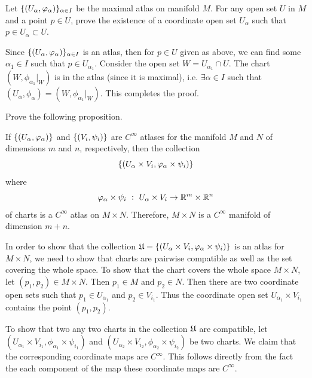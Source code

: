 \begin{problem}
	Let $ \{(U_\alpha, \varphi_\alpha)\}_{\alpha \in I} $ be the maximal atlas on manifold $ M $. For any open set $ U $ in $ M $ and a point $ p \in U $, prove the existence of a coordinate open set $ U_\alpha $ such that $ p \in U_\alpha \subset U $.
\end{problem}
\begin{solution}
	Since $ \{(U_\alpha,\varphi_\alpha)\}_{\alpha \in I} $ is an atlas, then for $ p \in U $ given as above, we can find some $ \alpha_1 \in I $ such that $ p \in U_{\alpha_1} $. Consider the open set $ W = U_{\alpha_1} \cap U $. The chart $ (W, \phi_{\alpha_1}|_W) $ is in the atlas (since it is maximal), i.e. $ \exists \alpha \in I $ such that $ (U_\alpha, \phi_\alpha) = (W, \phi_{\alpha_1}|_W) $. This completes the proof.
\end{solution}

\begin{problem}
	Prove the following proposition.
	\begin{proposition}
		If $ \{(U_\alpha,\varphi_\alpha)\} $ and $ \{(V_i,\psi_i)\} $ are $ C^\infty $ atlases for the manifold $ M $ and $ N $ of dimensions $ m $ and $ n $, respectively, then the collection 
		\[ \{(U_\alpha \times V_i,\varphi_\alpha \times \psi_i)\} \] where
		\[ \varphi_\alpha \times \psi_i\ :\ U_\alpha \times V_i \to \mathbb{R}^m \times \mathbb{R}^n \]
		of charts is a $ C^\infty $ atlas on $ M\times N $. Therefore, $ M\times N $ is a $ C^\infty $ manifold of dimension $ m+n $.
	\end{proposition}
\end{problem}
\begin{solution}
	In order to show that the collection $ \frak{U} = \{(U_\alpha \times V_i, \varphi_\alpha \times \psi_i)\} $ is an atlas for $ M\times N $, we need to show that charts are pairwise compatible as well as the set covering the whole space. To show that the chart covers the whole space $ M\times N $, let $ (p_1,p_2) \in M\times N $. Then $ p_1 \in M $ and $ p_2 \in N $. Then there are two coordinate open sets such that $ p_1 \in U_{\alpha_1} $ and $ p_2 \in V_{i_1} $. Thus the coordinate open set $ U_{\alpha_1} \times V_{i_1} $ contains the point $ (p_1,p_2) $.
	
	To show that two any two charts in the collection $ \frak{U} $ are compatible, let $ (U_{\alpha_1} \times V_{i_1},\phi_{\alpha_1}\times \psi_{i_1}) $ and $  (U_{\alpha_2} \times V_{i_2},\phi_{\alpha_2}\times \psi_{i_2}) $ be two  charts. We claim that the corresponding coordinate maps are $ C^\infty $. This follows directly from the fact the each component of the map these coordinate maps are $ C^\infty $.
\end{solution}

